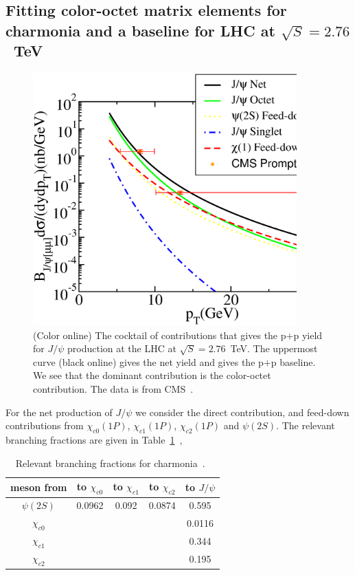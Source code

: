 \documentclass[article,showpacs,preprintnumbers,amsmath,amssymb]{revtex4}
\begin{document}
\begin{appendix}

\section{Fitting color-octet matrix elements for charmonia and a baseline for 
LHC at $\sqrt{S}=2.76$~TeV~\label{appendix:LHCbaseJ}}
\begin{figure}[!ht]
\vspace*{.2in}
\includegraphics[width=4.0in,angle=0]{fig25_lhc2760ppcocktail.eps} 
\caption{(Color online) The cocktail of contributions that gives the p$+$p
yield for $J/\psi$ production at the LHC at $\sqrt{S}=2.76$~TeV. The uppermost
curve (black online) gives the net yield and gives the p$+$p baseline. We see
that the dominant contribution is the color-octet  contribution. The data is
from CMS~\cite{Chatrchyan:2012np}.~\label{fig:LHC2760Jcocktail}}
\end{figure}

For the net production of $J/\psi$ we consider the direct contribution, and
feed-down contributions from $\chi_{c0}(1P)$, $\chi_{c1}(1P)$,
$\chi_{c2}(1P)$ and $\psi(2S)$. The relevant branching fractions are given
in Table~\ref{table:CharmoniaBFs}~\cite{pdg},
\begin{table}[h]
\begin{tabular}{c|cccc}
meson from &to $\chi_{c0}$ &to $\chi_{c1}$ &to $\chi_{c2}$ &to $J/\psi$\\ 
\hline
$\psi(2S)$ & 0.0962 & 0.092 & 0.0874 & 0.595   \\
$\chi_{c0}$& &  &  & 0.0116           \\
$\chi_{c1}$& &  &  & 0.344           \\
$\chi_{c2}$& &  &  & 0.195           \\
\end{tabular}
\caption{Relevant branching fractions for charmonia~\cite{pdg}.~\label{table:CharmoniaBFs}}
\end{table}


\end{appendix}
\end{document}
